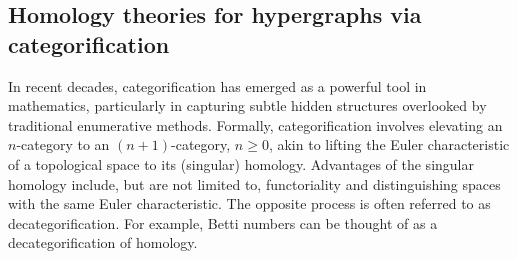 \documentclass{amsart}
\renewcommand{\H}{\mathcal{H}}
\begin{document}


\subsection{Homology theories for hypergraphs via categorification}
\label{sec:mag_chrom}


In recent decades, categorification has emerged as a powerful tool in mathematics, particularly in capturing subtle hidden structures overlooked by traditional enumerative methods. Formally, categorification involves elevating an 
$n$-category to an $(n+1)$-category, $n \geq 0$, akin to lifting the Euler characteristic of a topological space to its (singular) homology. Advantages of the singular homology include, but are not limited to, functoriality and distinguishing spaces with the same Euler characteristic. 
The opposite process is often referred to as decategorification. For example, Betti numbers can be thought of as a decategorification of homology. 
\end{document}
